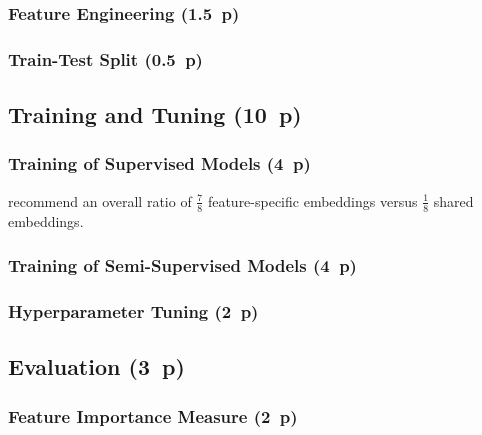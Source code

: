 \subsubsection{Feature Engineering (1.5~p)}\label{sec:feature-engineering}

\subsubsection{Train-Test Split (0.5~p)}\label{sec:train-test-split}


\subsection{Training and Tuning (10~p)}\label{sec:training-and-tuning}

\subsubsection{Training of Supervised
Models (4~p)}\label{sec:training-of-supervised-models}

\textcite[][12]{huangTabTransformerTabularData2020} recommend an overall ratio of $\tfrac{7}{8}$ feature-specific embeddings versus $\tfrac{1}{8}$ shared embeddings.

\subsubsection{Training of Semi-Supervised
Models (4~p)}\label{sec:training-of-semi-supervised-models}


\subsubsection{Hyperparameter Tuning (2~p)}\label{sec:hyperparameter-tuning}


\subsection{Evaluation (3~p)}\label{sec:evaluation}

\subsubsection{Feature Importance
Measure (2~p)}\label{sec:feature-importance-measure}


